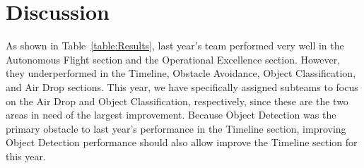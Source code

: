 \documentclass[]{auvsi_doc}
\begin{document}
\section{Discussion}
As shown in Table~\ref{table:Results}, last year's team performed very well in the Autonomous Flight section and the Operational Excellence section. However, they underperformed in the Timeline, Obstacle Avoidance, Object Classification, and Air Drop sections. This year, we have specifically assigned subteams to focus on the Air Drop and Object Classification, respectively, since these are the two areas in need of the largest improvement. Because Object Detection was the primary obstacle to last year's performance in the Timeline section, improving Object Detection performance should also allow improve the Timeline section for this year.
\end{document}
